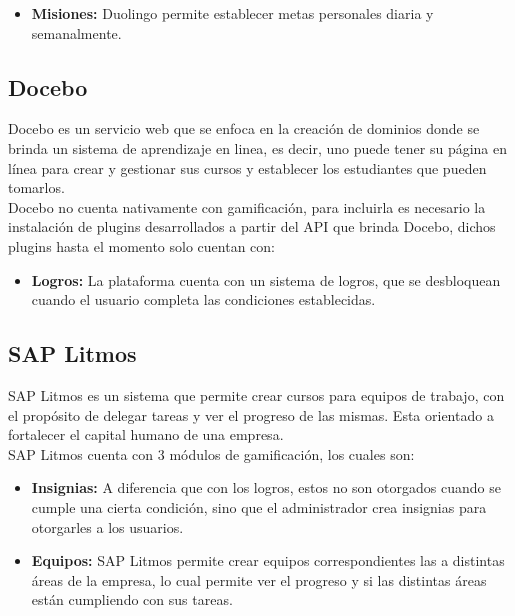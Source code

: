 \begin{multicols*}{2}
\begin{itemize}
    \item {\bf Misiones:} Duolingo permite establecer metas personales diaria y
        semanalmente.

    \end{itemize}


\subsection{Docebo}

 Docebo \cite{PagDocebo} es un servicio web que se enfoca en la creación de dominios donde se brinda
 un sistema de aprendizaje en linea, es decir, uno puede tener su página en línea para crear y gestionar
 sus cursos y establecer los estudiantes que pueden tomarlos.\\

 \noindent Docebo no cuenta nativamente con gamificación, para incluirla es necesario la instalación
 de plugins desarrollados a partir del API que brinda Docebo, dichos plugins hasta el momento solo
 cuentan con:

    \begin{itemize}
    \item {\bf Logros:} La plataforma cuenta con un sistema de logros, que se
                        desbloquean cuando el usuario completa las condiciones
                        establecidas.
    \end{itemize}

\subsection{SAP Litmos}

 SAP Litmos \cite{PagSAPLitmos} es un sistema que permite crear cursos para
 equipos de trabajo, con el propósito de delegar tareas y ver el progreso de
 las mismas. Esta orientado a fortalecer el capital humano de una empresa.\\

    \noindent SAP Litmos cuenta con 3 módulos de gamificación, los cuales son:

    \begin{itemize}
        \item {\bf Insignias:} A diferencia que con los logros, estos
        no son otorgados cuando se cumple una cierta condición, sino
        que el administrador crea insignias para otorgarles a los usuarios.

        \item {\bf Equipos:} SAP Litmos permite crear equipos correspondientes
        las a distintas áreas de la empresa, lo cual permite ver el progreso
        y si las distintas áreas están cumpliendo con sus tareas.


\end{itemize}
\end{multicols*}
